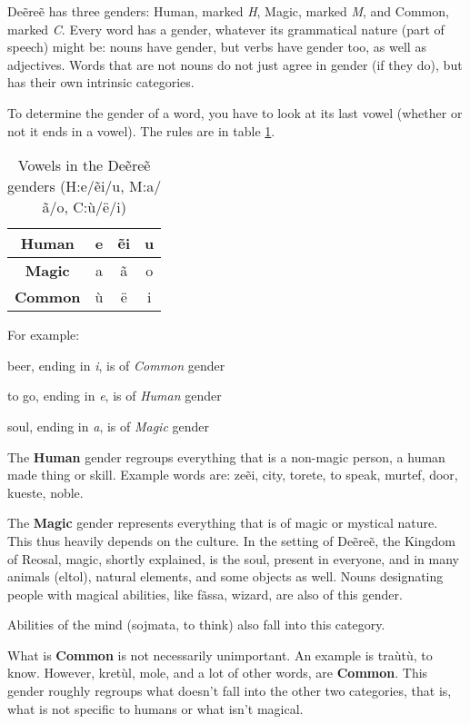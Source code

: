 Deẽreẽ has three genders: Human, marked \emph{H}, Magic, marked \emph{M}, and Common, marked
\emph{C}. Every word has a gender, whatever its grammatical nature (part of speech) might be: nouns
have gender, but verbs have gender too, as well as adjectives. Words that are not nouns do not just
agree in gender (if they do), but has their own intrinsic categories.

To determine the gender of a word, you have to look at its last vowel (whether or not it ends in a
vowel). The rules are in table \ref{tab:morph-genders}.

\begin{table}[h]\label{tab:morph-genders}
\begin{center}
\begin{tabular}{|c|ccc|}
\hline
\textbf{Human}  & e & ẽi & u\\\hline
\textbf{Magic}  & a & ã  & o\\\hline
\textbf{Common} & ù & ë  & i\\\hline
\end{tabular}
\end{center}
\caption{Vowels in the Deẽreẽ genders (H:e/ẽi/u, M:a/ã/o, C:ù/ë/i)}
\end{table}

For example:
\begin{description}
\item[\gls{zhalbarki}] beer, ending in \emph{i}, is of \emph{Common} gender
\item[\gls{drete}] to go, ending in \emph{e}, is of \emph{Human} gender
\item[\gls{magra}] soul, ending in \emph{a}, is of \emph{Magic} gender
\end{description}

The \textbf{Human} gender regroups everything that is a non-magic person, a human made thing or
skill. Example words are: \gls{zeẽi}, city, 
\gls{torete}, to speak, \gls{murtef}, door, \gls{kueste},
noble.

The \textbf{Magic} gender represents everything that is of magic or mystical nature. This thus
heavily depends on the culture. In the setting of Deẽreẽ, the Kingdom of Reosal, magic, shortly
explained, is the soul, present in everyone, and in many animals (\gls{eltol}),
natural elements, and some objects as well. Nouns designating people with magical abilities, like
\gls{fãssa}, wizard, are also of this gender.

Abilities of the mind (\gls{sojmata}, to think) also fall into this
category.

What is \textbf{Common} is not necessarily unimportant. An example is 
\gls{traùtù}, to know. However, \gls{kretùl}, mole, and a lot of other words,
are \textbf{Common}. This gender roughly regroups what doesn’t fall into the other two categories,
that is, what is not specific to humans or what isn’t magical.

